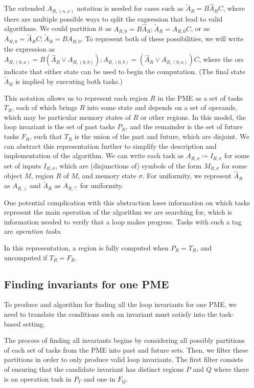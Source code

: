 \documentclass[12pt,letterpaper]{article}
\begin{document}
The extended $A_{R, (n, x)}$ notation is needed for cases such as $\widetilde{A}_R = B\hat{A}_RC$, where there are multiple possible ways to split the expression that lead to valid algorithms.
We could partition it as $A_{R, 0} = B\hat{A}_R; \widetilde{A}_R = A_{R, 0}C$, or as $A_{R, 0} = \hat{A}_RC; \widetilde{A}_R = BA_{R, 0}$.
To represent both of these possibilities, we will write the expression as $A_{R, (0, a)} = B(\hat{A}_R \vee A_{R, (0, b)}); A_{R, (0, b)} = (\hat{A}_R \vee A_{R, (0, a)})C$, where the ors indicate that either state can be used to begin the computation.
(The final state $\widetilde{A}_R$ is implied by executing both tasks.)

This notation allows us to represent each region $R$ in the PME as a set of tasks $T_R$, each of which brings $R$ into some state and depends on a set of operands, which may be particular memory states of $R$ or other regions.
In this model, the loop invariant is the set of past tasks $P_{R}$, and the remainder is the set of future tasks $F_{R}$, such that $T_R$ is the union of the past and future, which are disjoint.
We can abstract this representation further to simplify the description and implementation of the algorithm.
We can write each task as $A_{R, \sigma} \coloneqq I_{R, \sigma}$ for some set of inputs $I_{R, \sigma}$, which are (disjunctions of) symbols of the form $M_{R, \sigma}$ for some object $M$, region $R$ of $M$, and memory state $\sigma$.
For uniformity, we represent $\hat{A}_R$ as $A_{R, \bot}$ and $\widetilde{A}_R$ as $A_{R, \top}$ for uniformity.

One potential complication with this abstraction loses information on which tasks represent the main operation of the algorithm we are searching for, which is information needed to verify that a loop makes progress.
Tasks with such a tag are \emph{operation tasks}.

In this representation, a region is fully computed when $P_R = T_R$, and uncomputed if $T_R = F_R$.

\subsection{Finding invariants for one PME}
To produce and algorithm for finding all the loop invariants for one PME, we need to translate the conditions such an invariant must satisfy into the task-based setting.

The process of finding all invariants begins by considering all possibly partitions of each set of tasks from the PME into past and future sets.
Then, we filter these partitions in order to only produce valid loop invariants.
The first filter consists of ensuring that the candidate invariant has distinct regions $P$ and $Q$ where there is an operation task in $P_T$ and one in $F_Q$.
\end{document}
